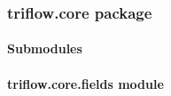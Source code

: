 \documentclass[letterpaper,10pt,english]{sphinxmanual}
\begin{document}
\subsubsection{triflow.core package}
\label{\detokenize{triflow.core:triflow-core-package}}\label{\detokenize{triflow.core::doc}}

\paragraph{Submodules}
\label{\detokenize{triflow.core:submodules}}

\paragraph{triflow.core.fields module}
\label{\detokenize{triflow.core:triflow-core-fields-module}}\label{\detokenize{triflow.core:module-triflow.core.fields}}
\end{document}

